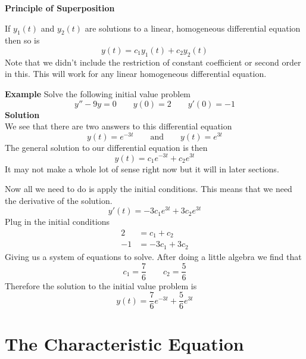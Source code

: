 \documentclass[10pt,reqno]{book}
\theoremstyle{definition}
\begin{document}
	\noindent \textbf{Principle of Superposition}

	\noindent If $ y_1(t) $ and $ y_2(t) $ are solutions to a linear, homogeneous differential equation then so is
	\[ y(t) = c_1y_1(t) + c_2y_2(t) \]
	Note that we didn’t include the restriction of constant coefficient or second order in this.  This will work for any linear homogeneous differential equation.

	\noindent \textbf{Example} Solve the following initial value problem
	\[ y'' - 9y = 0 \qquad y(0) = 2 \qquad y'(0) = -1 \]
	\textbf{Solution}\\
	We see that there are two answers to this differential equation
	\[ y(t) = e^{-3t} \qquad \text{and} \qquad y(t) = e^{3t} \]
	The general solution to our differential equation is then
	\[ y(t) = c_1e^{-3t} + c_2e^{3t} \]
	It may not make a whole lot of sense right now but it will in later sections.

	\noindent Now all we need to do is apply the initial conditions.  This means that we need the derivative of the solution.
	\[ y'(t) = -3c_1e^{3t} + 3c_2e^{3t} \]
	Plug in the initial conditions
	\begin{align*}
		2 &= c_1 + c_2\\
		-1 &= -3c_1 + 3c_2
	\end{align*}
	Giving us a system of equations to solve. After doing a little algebra we find that
	\[ c_1 = \frac{7}{6} \qquad c_2 = \frac{5}{6} \]
	Therefore the solution to the initial value problem is
	\[ y(t) = \frac{7}{6}e^{-3t} + \frac{5}{6}e^{3t} \]

	\section{The Characteristic Equation}
\end{document}
